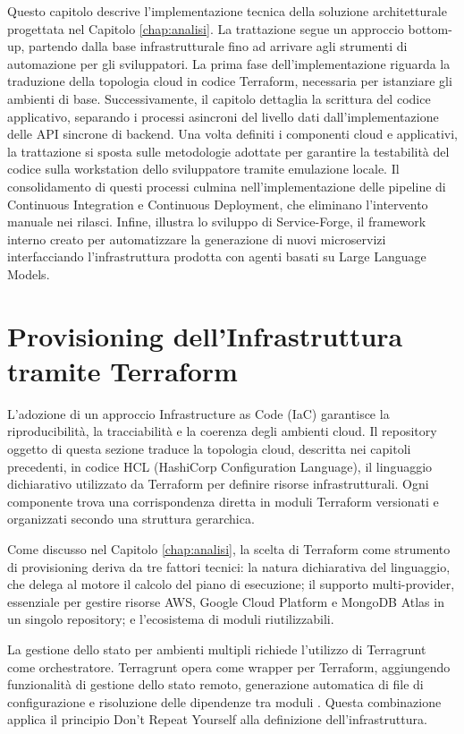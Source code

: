 Questo capitolo descrive l'implementazione tecnica della soluzione architetturale progettata nel Capitolo \ref{chap:analisi}. La trattazione segue un approccio bottom-up, partendo dalla base infrastrutturale fino ad arrivare agli strumenti di automazione per gli sviluppatori.  La prima fase dell'implementazione riguarda la traduzione della topologia cloud in codice Terraform, necessaria per istanziare gli ambienti di base. Successivamente, il capitolo dettaglia la scrittura del codice applicativo, separando i processi asincroni del livello dati dall'implementazione delle API sincrone di backend. Una volta definiti i componenti cloud e applicativi, la trattazione si sposta sulle metodologie adottate per garantire la testabilità del codice sulla workstation dello sviluppatore tramite emulazione locale. Il consolidamento di questi processi culmina nell'implementazione delle pipeline di Continuous Integration e Continuous Deployment, che eliminano l'intervento manuale nei rilasci. Infine, illustra lo sviluppo di Service-Forge, il framework interno creato per automatizzare la generazione di nuovi microservizi interfacciando l'infrastruttura prodotta con agenti basati su Large Language Models.

\section{Provisioning dell'Infrastruttura tramite Terraform}

L'adozione di un approccio Infrastructure as Code (IaC) garantisce la riproducibilità, la tracciabilità e la coerenza degli ambienti cloud. Il repository oggetto di questa sezione traduce la topologia cloud, descritta nei capitoli precedenti, in codice HCL (HashiCorp Configuration Language), il linguaggio dichiarativo utilizzato da Terraform per definire risorse infrastrutturali. Ogni componente trova una corrispondenza diretta in moduli Terraform versionati e organizzati secondo una struttura gerarchica.

Come discusso nel Capitolo \ref{chap:analisi}, la scelta di Terraform come strumento di provisioning deriva da tre fattori tecnici: la natura dichiarativa del linguaggio, che delega al motore il calcolo del piano di esecuzione; il supporto multi-provider, essenziale per gestire risorse AWS, Google Cloud Platform e MongoDB Atlas in un singolo repository; e l'ecosistema di moduli riutilizzabili.

La gestione dello stato per ambienti multipli richiede l'utilizzo di Terragrunt come orchestratore. Terragrunt opera come wrapper per Terraform, aggiungendo funzionalità di gestione dello stato remoto, generazione automatica di file di configurazione e risoluzione delle dipendenze tra moduli \cite{Terragrunt}. Questa combinazione applica il principio Don't Repeat Yourself alla definizione dell'infrastruttura.

